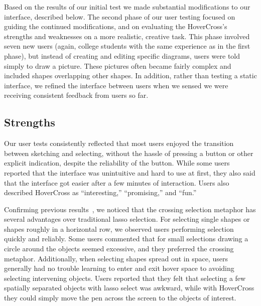 \documentclass{article}
\begin{document}
Based on the results of our initial test we made substantial modifications to our interface, described below.  
The second phase of our user testing focused on guiding the continued modifications, and on evaluating the HoverCross's strengths and weaknesses on a more realistic, creative task.  This phase involved seven new users (again, college students with the same experience as in the first phase), but instead 
of creating and editing specific diagrams, users were told simply to draw a picture.  These pictures often became fairly complex and included shapes overlapping other shapes.  In addition, rather than testing a static interface, we refined the interface between users when we sensed we were receiving consistent feedback from users so far.  



\subsection{Strengths}

Our user tests consistently reflected that most users enjoyed the
transition between sketching and selecting, without the hassle of
pressing a button or other explicit indication, despite the
reliability of the button.  While some users reported that the interface
was unintuitive and hard to use at first, they also said that the interface got easier 
after a few minutes of interaction.  Users also described HoverCross as ``interesting,'' ``promising,'' and
``fun.'' 

Confirming previous results~\cite{Apitz2004Crossy}, we noticed that the crossing
selection metaphor has several advantages over traditional lasso
selection.  For selecting single shapes or shapes roughly in a
horizontal row, we observed users performing selection quickly and reliably.  Some users
commented that for small selections drawing
a circle around the objects seemed excessive, and they preferred the crossing metaphor.  
Additionally, when selecting shapes spread out in space, users generally had no trouble 
learning to enter and exit hover space to avoiding selecting
intervening objects.  Users reported that they felt that selecting a few
spatially separated objects with lasso
select was awkward, while with HoverCross they could simply move the
pen across the screen to the objects of interest.  
\end{document}
